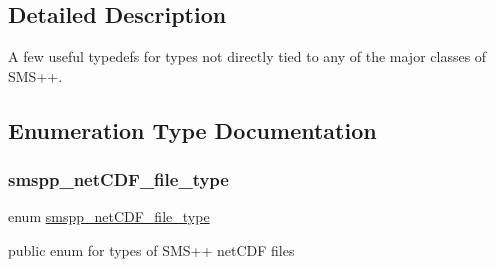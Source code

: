 \subsection{Detailed Description}
A few useful typedefs for types not directly tied to any of the major classes of S\+M\+S++. 

\subsection{Enumeration Type Documentation}
\mbox{\label{group___s_m_s__types_gab8fe98d4e6a9961e16ab25006d6eebd8}} 
\subsubsection{\texorpdfstring{smspp\+\_\+net\+C\+D\+F\+\_\+file\+\_\+type}{smspp\_netCDF\_file\_type}}
{\footnotesize\ttfamily enum \mbox{\hyperlink{group___s_m_s__types_gab8fe98d4e6a9961e16ab25006d6eebd8}{smspp\+\_\+net\+C\+D\+F\+\_\+file\+\_\+type}}}



public enum for types of S\+M\+S++ net\+C\+DF files 

